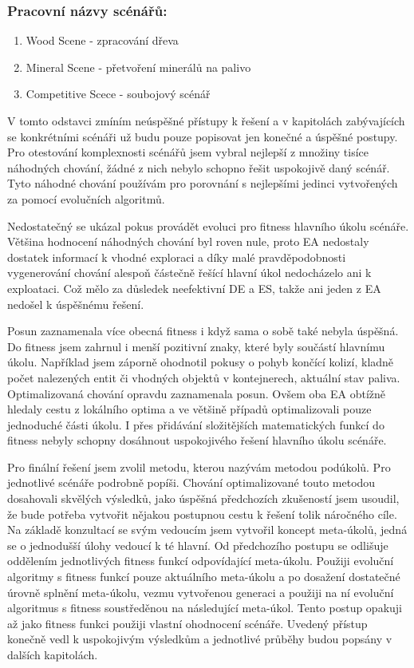 \subsubsection{Pracovní názvy scénářů:}
\begin{enumerate}
	\item Wood Scene - zpracování dřeva
	\item Mineral Scene - přetvoření minerálů na palivo 
	\item Competitive Scece - soubojový scénář
\end{enumerate}
\par
V tomto odstavci zmíním neúspěšné přístupy k řešení a v kapitolách zabývajících se konkrétními scénáři už budu pouze popisovat jen konečné a úspěšné postupy. Pro otestování komplexnosti scénářů jsem vybral nejlepší z množiny tisíce náhodných chování, žádné z nich nebylo schopno řešit uspokojivě daný scénář. Tyto náhodné chování používám pro porovnání s nejlepšími jedinci vytvořených za pomocí evolučních algoritmů.
 \par
Nedostatečný se ukázal pokus provádět evoluci pro fitness hlavního úkolu scénáře. Většina hodnocení náhodných chování byl roven nule, proto EA nedostaly dostatek informací k vhodné exploraci a díky malé pravděpodobnosti vygenerování chování alespoň částečně řešící hlavní úkol nedocházelo ani k exploataci. Což mělo za důsledek neefektivní  DE a ES, takže ani jeden z EA nedošel k úspěšnému řešení. 
\par
Posun zaznamenala více obecná fitness i když sama o sobě také nebyla úspěšná. Do fitness jsem zahrnul i menší pozitivní znaky, které byly součástí hlavnímu úkolu. Například jsem záporně ohodnotil pokusy o pohyb končící kolizí, kladně počet nalezených entit či vhodných objektů v kontejnerech, aktuální stav paliva. Optimalizovaná chování opravdu zaznamenala posun. Ovšem oba EA obtížně hledaly cestu z lokálního optima a ve většině případů optimalizovali pouze jednoduché části úkolu. I přes přidávání složitějších matematických funkcí do fitness nebyly schopny dosáhnout uspokojivého řešení hlavního úkolu scénáře. 
\par 
Pro finální řešení jsem zvolil metodu, kterou nazývám metodou podúkolů. Pro jednotlivé scénáře podrobně popíši. Chování optimalizované touto metodou dosahovali skvělých výsledků,  jako úspěšná předchozích zkušeností jsem usoudil, že bude potřeba vytvořit nějakou postupnou cestu k řešení tolik náročného cíle.  Na základě konzultací se svým vedoucím jsem vytvořil koncept meta-úkolů, jedná se o jednodušší úlohy vedoucí k té hlavní. Od předchozího postupu se odlišuje oddělením jednotlivých fitness funkcí odpovídající meta-úkolu. Použiji evoluční algoritmy s fitness funkcí pouze aktuálního meta-úkolu a po dosažení dostatečné úrovně splnění meta-úkolu, vezmu vytvořenou generaci a použiji na ní evoluční algoritmus s fitness soustředěnou na následující meta-úkol. Tento postup opakuji až jako fitness funkci použiji vlastní ohodnocení scénáře. Uvedený přístup konečně vedl k uspokojivým výsledkům a jednotlivé průběhy budou popsány v dalších kapitolách. \par 
